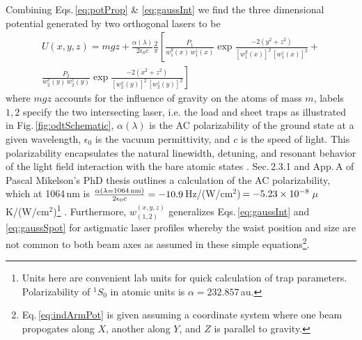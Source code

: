 Combining Eqs.\,\ref{eq:potProp} \& \ref{eq:gaussInt} we find the three dimensional potential generated by two orthogonal lasers to be
\begin{equation} \label{eq:indArmPot}
\begin{split}
	U(x,y,z) = m g z + \frac{\alpha(\lambda)}{2 \epsilon_0 c} \frac{2}{\pi} \left[ \frac{P_1}{w_1^y(x)\, w_1^z(x)} \exp{\frac{-2 (y^2+z^2)}{[w_1^y(x)]^2 \,[w_1^z(x)]^2}} + \right. \\
	\left. \frac{P_2}{w_2^x(y)\, w_2^z(y)} \exp{\frac{-2 (x^2+z^2)}{[w_2^x(y)]^2\,[w_2^z(y)]^2}} \right]
\end{split}
\end{equation}
where $mgz$ accounts for the influence of gravity on the atoms of mass $m$, labels $1,2$ specify the two intersecting laser, i.e. the load and sheet traps as illustrated in Fig.\,\ref{fig:odtSchematic}, $\alpha(\lambda)$ is the AC polarizability of the ground state at a given wavelength, $\epsilon_0$ is the vacuum permittivity, and $c$ is the speed of light.
This polarizability encapsulates the natural linewidth, detuning, and resonant behavior of the light field interaction with the bare atomic states \cite{Grimm1999a}.
Sec.\,2.3.1 and App.\,A of Pascal Mikelson's PhD thesis \cite{Mickelson2010b} outlines a calculation of the AC polarizability, which at 1064\,nm is $\frac{\alpha( \lambda = \text{1064\,nm} )}{2 \epsilon_0 c} = -10.9$\,Hz/(W/cm$^2$)\,$=-5.23\times 10^{-8}$\,$\mu$K/(W/cm$^2$)\footnote{Units here are convenient lab units for quick calculation of trap parameters. Polarizability of $^1S_0$ in atomic units is $\alpha = 232.857$\,au.}  \cite{Ye2008}.
Furthermore, $w_{(1,2)}^{(x,y,z)}$ generalizes Eqs.\,\ref{eq:gaussInt} and \ref{eq:gaussSpot} for astigmatic laser profiles whereby the waist position and size are not common to both beam axes as assumed in these simple equations\footnote{Eq.\,\ref{eq:indArmPot} is given assuming a coordinate system where one beam propogates along $X$, another along $Y$, and $Z$ is parallel to gravity.}.

